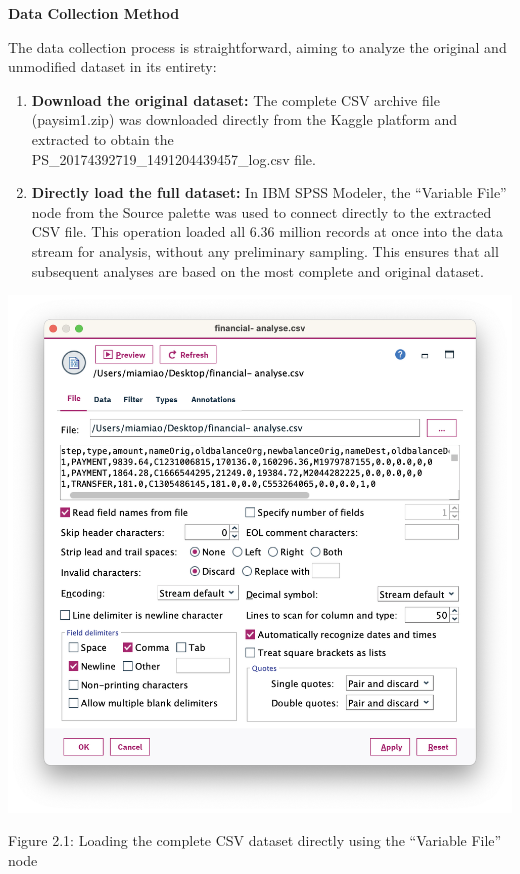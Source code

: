 \documentclass[sigplan,screen]{acmart}
\begin{document}
\textbf{Data Collection Method}

The data collection process is straightforward, aiming to analyze the original and unmodified dataset in its entirety:

\begin{enumerate}
\item \textbf{Download the original dataset:} The complete CSV archive file (paysim1.zip) was downloaded directly from the Kaggle platform and extracted to obtain the \\PS\_20174392719\_1491204439457\_log.csv file.
\item \textbf{Directly load the full dataset:} In IBM SPSS Modeler, the ``Variable File'' node from the Source palette was used to connect directly to the extracted CSV file. This operation loaded all 6.36 million records at once into the data stream for analysis, without any preliminary sampling. This ensures that all subsequent analyses are based on the most complete and original dataset.
\end{enumerate}

\vspace{0.3cm}

\begin{center}
\includegraphics[width=0.9\columnwidth]{2.1.png}
\vspace{0.2cm}

Figure 2.1: Loading the complete CSV dataset directly using the ``Variable File'' node
\end{center}
\end{document}
